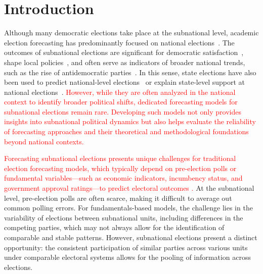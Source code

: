 \documentclass[doublespaced,12pt]{article}
\begin{document}






\section{Introduction}


\begin{doublespacing}


Although many democratic elections take place at the subnational level, academic election forecasting has predominantly focused on national elections~\citep[see e.g.][]{lewis2005election,stegmaier2022forecasting,stegmaier2023evolution}. The outcomes of subnational elections are significant for democratic satisfaction~\citep{singh2012differentiating}, shape local policies~\citep{alt2000dynamic,uppal2011does}, and often serve as indicators of broader national trends, such as the rise of antidemocratic parties~\citep{arzheimer2019don}. In this sense, state elections have also been used to predict national-level elections~\citep{kayser2017lander} or explain state-level support at national elections~\citep{erikson2015gubernatorial}. \textcolor{red}{However, while they are often analyzed in the national context to identify broader political shifts, dedicated forecasting models for subnational elections remain rare. Developing such models not only provides insights into subnational political dynamics but also helps evaluate the reliability of forecasting approaches and their theoretical and methodological foundations beyond national contexts.}

\textcolor{red}{Forecasting subnational elections presents unique challenges for traditional election forecasting models, which typically depend on pre-election polls or fundamental variables—such as economic indicators, incumbency status, and government approval ratings—to predict electoral outcomes \citep{lewis2015forecasting,nadeau2020election}.} At the subnational level, pre-election polls are often scarce, making it difficult to average out common polling errors. For fundamentals-based models, the challenge lies in the variability of elections between subnational units, including differences in the competing parties, which may not always allow for the identification of comparable and stable patterns. However, subnational elections present a distinct opportunity: the consistent participation of similar parties across various units under comparable electoral systems allows for the pooling of information across elections.


\end{doublespacing}
\end{document}
